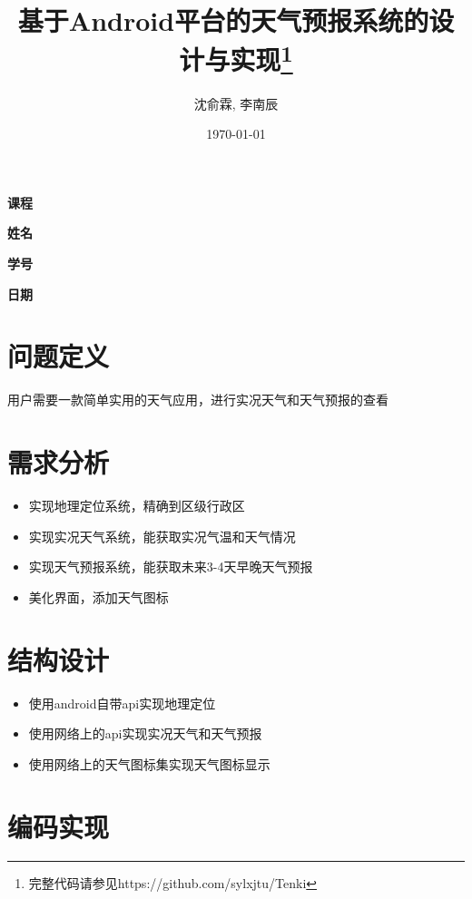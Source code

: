 \documentclass[UTF8]{ctexart}
\title{基于Android平台的天气预报系统的设计与实现\footnote{完整代码请参见https://github.com/sylxjtu/Tenki}}
\date{\today}
\author{沈俞霖, 李南辰}
\begin{document}
  \maketitle
  \vspace{80mm}
  \begin{flushright}

  \textbf{课程} 

  \textbf{姓名} 


  \textbf{学号} 


  \textbf{日期} \makebox[7em][l]{\today}

  \end{flushright}
  \newpage

  \tableofcontents
  \newpage

  \section{问题定义}
    用户需要一款简单实用的天气应用，进行实况天气和天气预报的查看
  \section{需求分析}
    \begin{itemize}
      \item 实现地理定位系统，精确到区级行政区
      \item 实现实况天气系统，能获取实况气温和天气情况
      \item 实现天气预报系统，能获取未来3-4天早晚天气预报
      \item 美化界面，添加天气图标
    \end{itemize}
  \section{结构设计}
    \begin{itemize}
      \item 使用android自带api实现地理定位
      \item 使用网络上的api实现实况天气和天气预报
      \item 使用网络上的天气图标集实现天气图标显示
    \end{itemize}
  \section{编码实现}
\end{document}
